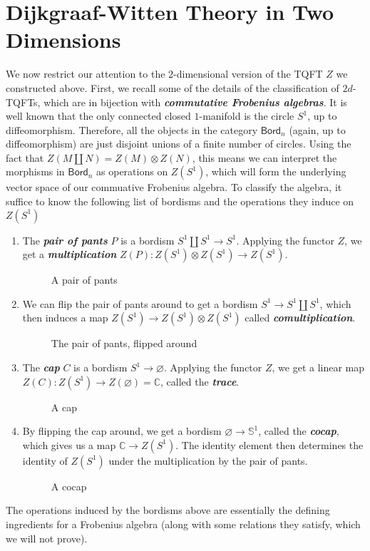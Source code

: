 \documentclass[psamsfonts, 11pt]{amsart}
\newcommand{\incfig}[2]{%
    \def\svgwidth{\columnwidth}
    \scalebox{#2}{}
}
\theoremstyle{definition}
\theoremstyle{remark}
\newcommand{\Bord}{\mathsf{Bord}}
\renewcommand{\emptyset}{\varnothing}
\newcommand{\ib}[1]{\textbf{\textit{#1}}}
\newcommand{\C}{\mathbb{C}}
\renewcommand{\S}{\mathbb{S}}
\begin{document}
\section{Dijkgraaf-Witten Theory in Two Dimensions}
%
We now restrict our attention to the $2$-dimensional version of the TQFT $Z$
we constructed above. First, we recall some of the details of the classification of
$2d$-TQFTs, which are in bijection with \ib{commutative Frobenius algebras}. It is well
known that the only connected closed $1$-manifold is the circle $S^1$, up to
diffeomorphism. Therefore, all the objects in the category $\Bord_n$ (again, up to
diffeomorphism) are just disjoint unions of a finite number of circles. Using the fact
that $Z(M \coprod N) = Z(M) \otimes Z(N)$, this means we can interpret the morphisms
in $\Bord_n$ as operations on $Z(S^1)$, which will form the underlying vector space
of our commuative Frobenius algebra. To classify the algebra, it suffice to know the
following list of bordisms and the operations they induce on $Z(S^1)$
\begin{enumerate}
  \item The \ib{pair of pants} $P$ is a bordism $S^1 \coprod S^1 \to S^1$. Applying
  the functor $Z$, we get a \ib{multiplication}
  $Z(P) : Z(S^1) \otimes Z(S^1) \to Z(S^1)$.
  \begin{figure}[ht]
      \centering
      \incfig{pair_of_pants}{0.15}
      \caption{A pair of pants}
  \end{figure}
  \item We can flip the pair of pants around to get a bordism $S^1 \to S^1 \coprod S^1$,
  which then induces a map $Z(S^1) \to Z(S^1) \otimes Z(S^1)$ called
  \ib{comultiplication}.
  \begin{figure}[ht]
      \centering
      \incfig{flipped_pair_of_pants}{0.15}
      \caption{The pair of pants, flipped around}
  \end{figure}
  \item The \ib{cap} $C$ is a bordism $S^1 \to \emptyset$. Applying the functor $Z$, we
  get a linear map $Z(C) : Z(S^1) \to Z(\emptyset) = \C$, called the \ib{trace}.
  \begin{figure}[ht]
      \centering
      \incfig{cap}{0.15}
      \caption{A cap}
  \end{figure}
  \item By flipping the cap around, we get a bordism $\emptyset \to \S^1$, called
  the \ib{cocap}, which gives us a map $\C \to Z(S^1)$. The identity element then
  determines the identity of $Z(S^1)$ under the multiplication by the pair of pants.
  \begin{figure}[ht]
      \centering
      \incfig{cocap}{0.15}
      \caption{A cocap}
  \end{figure}
\end{enumerate}
%
The operations induced by the bordisms above are essentially the defining ingredients
for a Frobenius algebra (along with some relations they satisfy, which we will
not prove).
\end{document}
